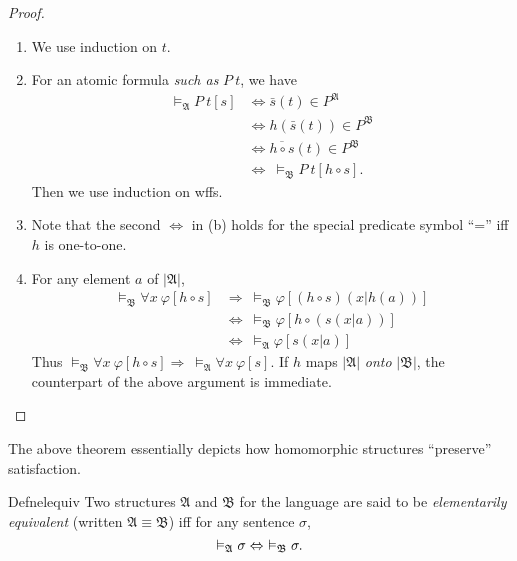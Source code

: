 \begin{proof}
  \begin{enumerate}[label=(\alph*)]
    \item We use induction on $t$.
    \item For an atomic formula \textit{such as} $P\ t$, we have
          \begin{align*}
            \vDash_{\mathfrak{A}}P\ t[s] & \Leftrightarrow \bar{s}(t)\in P^{\mathfrak{A}}             \\
                                         & \Leftrightarrow h(\bar{s}(t))\in P^{\mathfrak{B}}          \\
                                         & \Leftrightarrow \overline{h\circ s}(t)\in P^{\mathfrak{B}} \\
                                         & \Leftrightarrow\ \vDash_{\mathfrak{B}}P\ t[h\circ s].
          \end{align*}
          Then we use induction on wffs.
    \item Note that the second $\Leftrightarrow$ in (b) holds for the special predicate symbol ``='' iff $h$ is one-to-one.
    \item For any element $a$ of $|\mathfrak{A}|$,
          \begin{align*}
            \vDash_{\mathfrak{B}}\forall x\ \varphi[h\circ s] & \Rightarrow\ \vDash_{\mathfrak{B}}\varphi[(h\circ s)(x|h(a))] \\
                                                              & \Leftrightarrow\ \vDash_{\mathfrak{B}}\varphi[h\circ(s(x|a))] \\
                                                              & \Leftrightarrow\ \vDash_{\mathfrak{A}}\varphi[s(x|a)]
          \end{align*}
          Thus $\vDash_{\mathfrak{B}}\forall x\ \varphi[h\circ s]\Rightarrow\ \vDash_{\mathfrak{A}}\forall x\ \varphi[s].$ If $h$ maps $|\mathfrak{A}|$ \textit{onto} $|\mathfrak{B}|$, the counterpart of the above argument is immediate.\qedhere
  \end{enumerate}
\end{proof}

The above theorem essentially depicts how homomorphic structures ``preserve'' satisfaction.

\begin{reference}{Defn}{elequiv}
  Two structures $\mathfrak{A}$ and $\mathfrak{B}$ for the language are said to be \textit{elementarily equivalent} (written $\mathfrak{A}\equiv \mathfrak{B}$) iff for any sentence $\sigma$,
  \[
    \vDash_{\mathfrak{A}}\sigma\Leftrightarrow\ \vDash_{\mathfrak{B}}\sigma.\qedhere
  \]
\end{reference}

